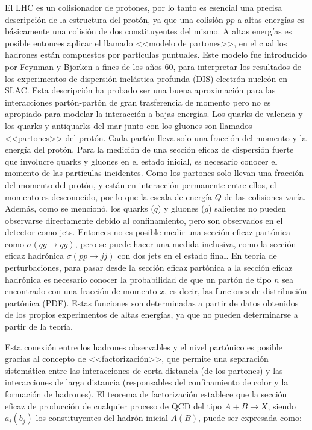 El LHC es un colisionador de protones, por lo tanto es esencial una precisa
descripción de la estructura del protón, ya que una colisión $pp$ a altas
energías es básicamente una colisión de dos constituyentes del mismo.
A altas energías es posible entonces aplicar el llamado <<modelo de
partones>>, en el cual los hadrones están compuestos por partículas puntuales.
Este modelo fue introducido por Feynman \cite{PhysRevLett.23.1415} y Bjorken
\cite{PhysRev.185.1975} a fines de los a\~nos 60, para interpretar los
resultados de los experimentos de dispersión inelástica profunda (DIS)
electrón-nucleón en SLAC. Esta descripción ha probado ser una buena aproximación
para las interacciones partón-partón de gran trasferencia de momento pero no es
apropiado para modelar la interacción a bajas energías. Los quarks de valencia y
los quarks y antiquarks del mar junto con los gluones son llamados
<<partones>> del protón. Cada partón lleva solo una fracción del momento y la
energía del protón. Para la medición de una sección eficaz de dispersión fuerte
que involucre quarks y gluones en el estado inicial, es necesario conocer el
momento de las partículas incidentes. Como los partones solo llevan una fracción
del momento del protón, y están en interacción permanente entre ellos, el momento es
desconocido, por lo que la escala de energía $Q$ de las colisiones varía. Además,
como se mencionó, los quarks ($q$) y
gluones ($g$) salientes no pueden observarse directamente debido al confinamiento,
pero son observados en el detector como jets. Entonces no es posible
medir una sección eficaz partónica como $\sigma(qg \to qg)$, pero se puede hacer
una medida inclusiva, como la sección eficaz hadrónica $\sigma(pp \to jj)$ con
dos jets en el estado final. En teoría de perturbaciones, para pasar desde la
sección eficaz partónica a la sección eficaz hadrónica es necesario conocer la
probabilidad de que un partón de tipo $n$ sea encontrado con una fracción de
momento $x$, es decir, las funciones de distribución partónica (PDF). Estas
funciones son determinadas a partir de datos obtenidos de los propios
experimentos de altas energías, ya que no pueden determinarse a partir de la
teoría.

Esta conexión entre los hadrones observables y el nivel partónico es posible
gracias al concepto de <<factorización>>, que permite una separación
sistemática entre las interacciones de corta distancia (de los partones) y las
interacciones de larga distancia (responsables del confinamiento de color y la
formación de hadrones). El teorema de factorización \cite{Ellis1978281}
establece que la sección eficaz de producción de cualquier proceso de QCD del
tipo $A+B\to X$, siendo $a_i(b_j)$ los constituyentes del hadrón inicial $A(B)$,
puede ser expresada como:

